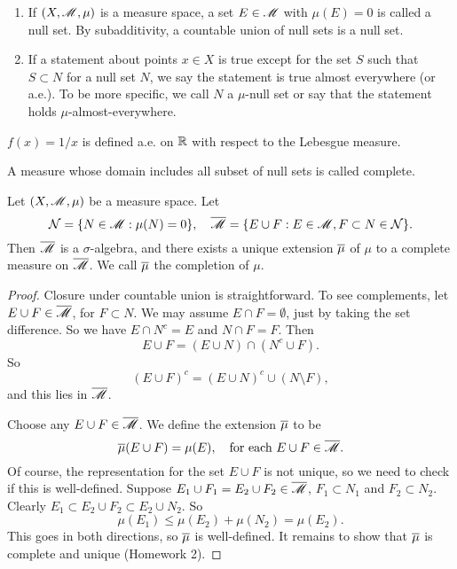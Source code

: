 \documentclass[12pt]{article} %
\begin{document}
\begin{definition}
    \begin{enumerate}
        \item If $(X, \mathscr{M}, \mu)$ is a measure space, a set $E \in \mathscr{M}$ with $\mu(E) = 0$ is called a null set. By subadditivity, a countable union of null sets is a null set.
        \item If a statement about points $x \in X$ is true except for the set $S$ such that $S \subset N$ for a null set $N$, we say the statement is true almost everywhere (or a.e.). To be more specific, we call $N$ a $\mu$-null set or say that the statement holds $\mu$-almost-everywhere.
    \end{enumerate}
\end{definition}

\begin{example}
    $f(x) = 1/x$ is defined a.e. on $\mathbb{R}$ with respect to the Lebesgue measure.
\end{example}

\begin{definition}
    A measure whose domain includes all subset of null sets is called complete.
\end{definition}

\begin{theorem}
    Let $(X, \mathscr{M}, \mu)$ be a measure space. Let \[\mathcal{N} = \{N \in \mathscr{M} : \mu(N) = 0\}, \ \ \ \overline{\mathscr{M}} = \{E \cup F : E \in \mathscr{M}, F \subset N \in \mathcal{N}\}.\] Then $\overline{\mathscr{M}}$ is a $\sigma$-algebra, and there exists a unique extension $\overline{\mu}$ of $\mu$ to a complete measure on $\overline{\mathscr{M}}$. We call $\overline{\mu}$ the completion of $\mu$.
\end{theorem}

\begin{proof}
    Closure under countable union is straightforward. To see complements, let $E \cup F \in \overline{\mathscr{M}}$, for $F \subset N$. We may assume $E \cap F = \emptyset$, just by taking the set difference. So we have $E \cap N^c = E$ and $N \cap F = F$. Then \[E \cup F = (E \cup N) \cap (N^c \cup F).\] So \[(E \cup F)^c = (E \cup N)^c \cup (N \setminus F),\] and this lies in $\overline{\mathscr{M}}$.

    Choose any $E \cup F \in \overline{\mathscr{M}}$. We define the extension $\overline{\mu}$ to be \[\ol{\mu}(E \cup F) = \mu(E), \ \ \ \text{for each $E \cup F \in \ol{\SM}$}.\] Of course, the representation for the set $E \cup F$ is not unique, so we need to check if this is well-defined. Suppose $E_1 \cup F_1 = E_2 \cup F_2 \in \overline{\mathscr{M}}$, $F_1 \subset N_1$ and $F_2 \subset N_2$. Clearly $E_1 \subset E_2 \cup F_2 \subset E_2 \cup N_2$. So \[\mu(E_1) \leq \mu(E_2) + \mu(N_2) = \mu(E_2).\] This goes in both directions, so $\overline{\mu}$ is well-defined. It remains to show that $\overline{\mu}$ is complete and unique (Homework 2).
\end{proof}
\end{document}
